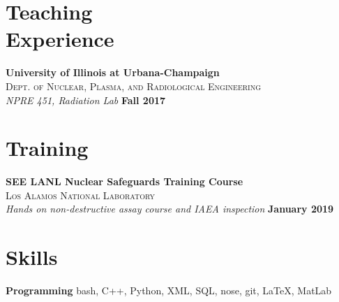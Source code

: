 \documentclass[margin,line]{resume}
\begin{document}
\begin{resume}
    \section{\mysidestyle Teaching\\Experience}
    \textbf{University of Illinois at Urbana-Champaign}\\
    \textsc{Dept. of Nuclear, Plasma, and Radiological Engineering}\\ 
               \textsl{NPRE 451, Radiation Lab} \hfill \textbf{Fall 2017}
               
    \section{\mysidestyle Training}
    \textbf{SEE LANL Nuclear Safeguards Training Course}\\
    \textsc{Los Alamos National Laboratory}\\
    			\textsl{Hands on non-destructive assay course and IAEA inspection} 
    			\hfill \textbf{January 2019}
    
    \section{\mysidestyle Skills}
                \textbf{Programming} \hfill bash, C++, Python, XML, SQL, nose, git, \LaTeX, MatLab\vspace{.5mm}\\%
                




\end{resume}
\end{document}
